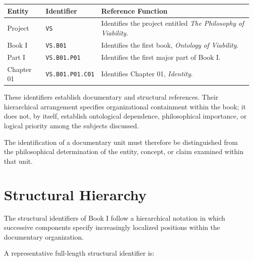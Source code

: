 \begin{center}
\small
\setlength{\tabcolsep}{4pt}
\begin{tabularx}{\textwidth}{
    >{\raggedright\arraybackslash}p{}
    >{\raggedright\arraybackslash}p{}
    >{\raggedright\arraybackslash}X
}
\toprule
\textbf{Entity} &
\textbf{Identifier} &
\textbf{Reference Function}
\\
\midrule

Project
&
\texttt{VS}
&
Identifies the project entitled
\textit{The Philosophy of Viability}.
\\

Book I
&
\texttt{VS.B01}
&
Identifies the first book,
\textit{Ontology of Viability}.
\\

Part I
&
\texttt{VS.B01.P01}
&
Identifies the first major part of Book I.
\\

Chapter 01
&
\texttt{VS.B01.P01.C01}
&
Identifies Chapter 01, \textit{Identity}.
\\
\bottomrule
\end{tabularx}
\end{center}

These identifiers establish documentary and structural
references. Their hierarchical arrangement specifies
organizational containment within the book; it does not,
by itself, establish ontological dependence, philosophical
importance, or logical priority among the subjects discussed.

The identification of a documentary unit must therefore
be distinguished from the philosophical determination of
the entity, concept, or claim examined within that unit.



\section*{Structural Hierarchy}

The structural identifiers of Book I follow a hierarchical
notation in which successive components specify increasingly
localized positions within the documentary organization.

A representative full-length structural identifier is:

